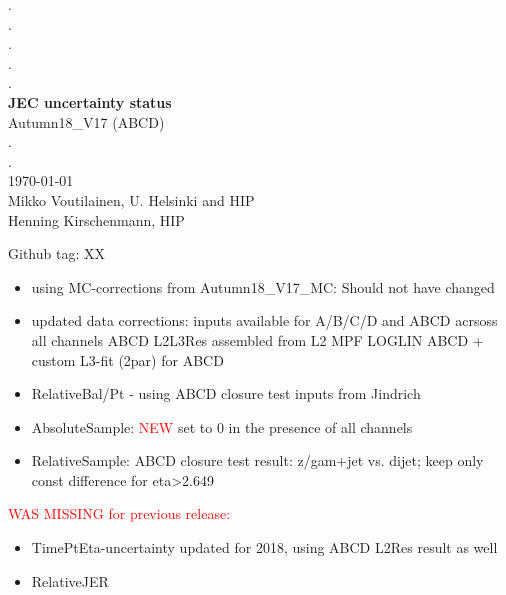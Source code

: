 \documentclass[landscape,10pt]{beamer} %
\begin{document}
\begin{centering}
{. }\\
{. }\\
{. }\\
{. }\\
{. }\\
{\bf JEC uncertainty status}\\
Autumn18\_V17 (ABCD)\\
.\\
.\\
\today\\
Mikko Voutilainen, U. Helsinki and HIP\\
Henning Kirschenmann, HIP\\
\end{centering}

\newpage

Github tag: XX

\begin{itemize}
\item using  MC-corrections from Autumn18\_V17\_MC: Should not have changed
\item updated data corrections: inputs available for A/B/C/D and ABCD acrsoss all channels ABCD L2L3Res assembled from L2 MPF LOGLIN ABCD + custom L3-fit (2par) for ABCD
\item RelativeBal/Pt -  using ABCD closure test inputs from Jindrich
\item AbsoluteSample: \textcolor{red}{NEW} set to 0 in the presence of all channels
\item RelativeSample: ABCD closure test result: z/gam+jet vs. dijet; keep only const difference for eta>2.649
\end{itemize}
\textcolor{red}{WAS MISSING for previous release:}
\begin{itemize}
\item TimePtEta-uncertainty updated for 2018, using ABCD L2Res result as well
\item RelativeJER
\end{itemize}
\end{document}
